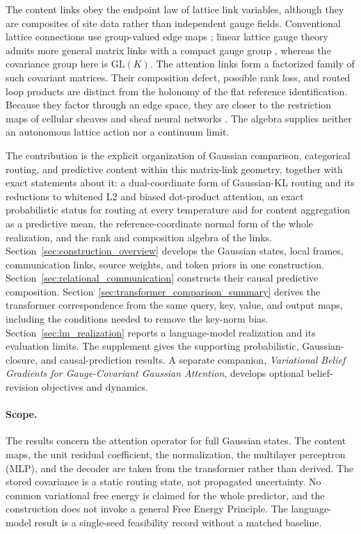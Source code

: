 \documentclass[twoside,11pt]{article}
\begin{document}
The content links obey the endpoint law of lattice link variables, although they are composites of site data rather than independent gauge fields. Conventional lattice connections use group-valued edge maps \citep{WilsonConfinement1974}; linear lattice gauge theory admits more general matrix links with a compact gauge group \citep{Wetterich2014LinearLattice}, whereas the covariance group here is $\mathrm{GL}(K)$. The attention links form a factorized family of such covariant matrices. Their composition defect, possible rank loss, and routed loop products are distinct from the holonomy of the flat reference identification. Because they factor through an edge space, they are closer to the restriction maps of cellular sheaves and sheaf neural networks \citep{HansenGhrist2019,Bodnar2022NeuralSheaf}. The algebra supplies neither an autonomous lattice action nor a continuum limit.

The contribution is the explicit organization of Gaussian comparison, categorical routing, and predictive content within this matrix-link geometry, together with exact statements about it: a dual-coordinate form of Gaussian-KL routing and its reductions to whitened L2 and biased dot-product attention, an exact probabilistic status for routing at every temperature and for content aggregation as a predictive mean, the reference-coordinate normal form of the whole realization, and the rank and composition algebra of the links. Section~\ref{sec:construction_overview} develops the Gaussian states, local frames, communication links, source weights, and token priors in one construction. Section~\ref{sec:relational_communication} constructs their causal predictive composition. Section~\ref{sec:transformer_comparison_summary} derives the transformer correspondence from the same query, key, value, and output maps, including the conditions needed to remove the key-norm bias. Section~\ref{sec:lm_realization} reports a language-model realization and its evaluation limits. The supplement gives the supporting probabilistic, Gaussian-closure, and causal-prediction results. A separate companion, \emph{Variational Belief Gradients for Gauge-Covariant Gaussian Attention}, develops optional belief-revision objectives and dynamics.

\paragraph{Scope.} The results concern the attention operator for full Gaussian states. The content maps, the unit residual coefficient, the normalization, the multilayer perceptron (MLP), and the decoder are taken from the transformer rather than derived. The stored covariance is a static routing state, not propagated uncertainty. No common variational free energy is claimed for the whole predictor, and the construction does not invoke a general Free Energy Principle. The language-model result is a single-seed feasibility record without a matched baseline.
\end{document}
